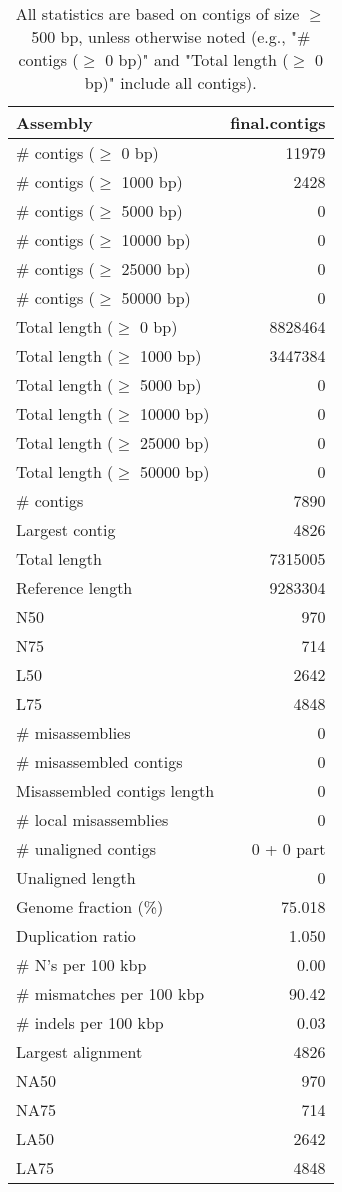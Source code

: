 \documentclass[12pt,a4paper]{article}
\begin{document}
\begin{table}[ht]
\begin{center}
\caption{All statistics are based on contigs of size $\geq$ 500 bp, unless otherwise noted (e.g., "\# contigs ($\geq$ 0 bp)" and "Total length ($\geq$ 0 bp)" include all contigs).}
\begin{tabular}{|l*{1}{|r}|}
\hline
Assembly & final.contigs \\ \hline
\# contigs ($\geq$ 0 bp) & 11979 \\ \hline
\# contigs ($\geq$ 1000 bp) & 2428 \\ \hline
\# contigs ($\geq$ 5000 bp) & 0 \\ \hline
\# contigs ($\geq$ 10000 bp) & 0 \\ \hline
\# contigs ($\geq$ 25000 bp) & 0 \\ \hline
\# contigs ($\geq$ 50000 bp) & 0 \\ \hline
Total length ($\geq$ 0 bp) & 8828464 \\ \hline
Total length ($\geq$ 1000 bp) & 3447384 \\ \hline
Total length ($\geq$ 5000 bp) & 0 \\ \hline
Total length ($\geq$ 10000 bp) & 0 \\ \hline
Total length ($\geq$ 25000 bp) & 0 \\ \hline
Total length ($\geq$ 50000 bp) & 0 \\ \hline
\# contigs & 7890 \\ \hline
Largest contig & 4826 \\ \hline
Total length & 7315005 \\ \hline
Reference length & 9283304 \\ \hline
N50 & 970 \\ \hline
N75 & 714 \\ \hline
L50 & 2642 \\ \hline
L75 & 4848 \\ \hline
\# misassemblies & 0 \\ \hline
\# misassembled contigs & 0 \\ \hline
Misassembled contigs length & 0 \\ \hline
\# local misassemblies & 0 \\ \hline
\# unaligned contigs & 0 + 0 part \\ \hline
Unaligned length & 0 \\ \hline
Genome fraction (\%) & 75.018 \\ \hline
Duplication ratio & 1.050 \\ \hline
\# N's per 100 kbp & 0.00 \\ \hline
\# mismatches per 100 kbp & 90.42 \\ \hline
\# indels per 100 kbp & 0.03 \\ \hline
Largest alignment & 4826 \\ \hline
NA50 & 970 \\ \hline
NA75 & 714 \\ \hline
LA50 & 2642 \\ \hline
LA75 & 4848 \\ \hline
\end{tabular}
\end{center}
\end{table}
\end{document}
